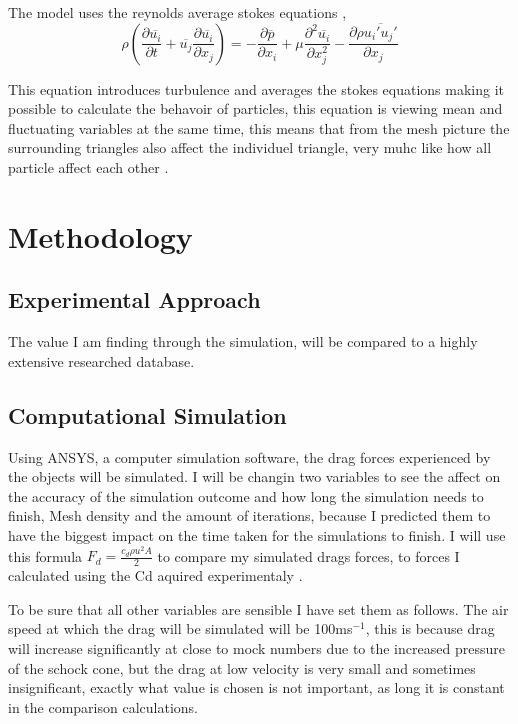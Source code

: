 \documentclass[12pt,a4paper]{article}
\begin{document}
The model uses the reynolds average stokes equations \cite{launder1974application},
\begin{equation}
\rho\left(\frac{\partial \overline{u_i}}{\partial t} + \overline{u_j}\frac{\partial \overline{u_i}}{\partial x_j}\right) = -\frac{\partial \overline{p}}{\partial x_i} + \mu\frac{\partial^2 \overline{u_i}}{\partial x_j^2} - \frac{\partial \rho\overline{u_i' u_j'}}{\partial x_j}
\end{equation}

This equation introduces turbulence and averages the stokes equations making it possible to calculate the behavoir of particles,  this equation is viewing mean and fluctuating variables at the same time, this means that from the mesh picture the surrounding triangles also affect the individuel triangle, very muhc like how all particle affect each other \cite{munson2016fundamentals}.

\section{Methodology}

\subsection{Experimental Approach}

The value I am finding through the simulation, will be compared to a highly extensive researched database.

\subsection{Computational Simulation}

Using ANSYS, a computer simulation software, the drag forces experienced by the objects will be simulated. I will be changin two variables to see the affect on the accuracy of the simulation outcome and how long the simulation needs to finish, Mesh density and the amount of iterations, because I predicted them to have the biggest impact on the time taken for the simulations to finish. I will use this formula $F_d = \frac{c_d \rho u^2 A}{2}$ to compare my simulated drags forces, to forces I calculated using the Cd aquired experimentaly \cite{anderson2016fundamentals}. 

To be sure that all other variables are sensible I have set them as follows. The air speed at which the drag will be simulated will be 100ms$^{-1}$, this is because drag will increase significantly at close to mock numbers due to the increased pressure of the schock cone, but the drag at low velocity is very small and sometimes insignificant, exactly what value is chosen is not important, as long it is constant in the comparison calculations. 
\end{document}
